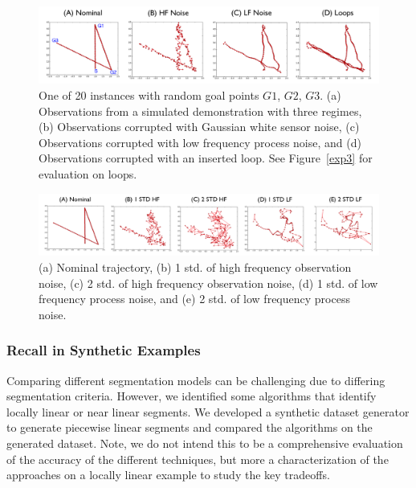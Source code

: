 \begin{figure}[ht!]%
\centering
\includegraphics[width=\textwidth]{tsc-experiments/tsc_segmentation_benchmark.png}
\caption{One of 20 instances with random goal points $G1$, $G2$, $G3$. (a) Observations from a simulated demonstration with three regimes, (b) Observations corrupted with Gaussian white sensor noise, (c) Observations corrupted with low frequency process noise, and (d) Observations corrupted with an inserted loop. See Figure~\ref{exp3} for evaluation on loops. \label{simulated}}
\end{figure}

\begin{figure}[ht!]%
\centering
\includegraphics[width=\textwidth]{tsc-experiments/noise_illustration.png}
\caption{(a) Nominal trajectory, (b) 1 std. of high frequency observation noise, (c) 2 std. of high frequency observation noise,  (d) 1 std. of low frequency process noise, and (e) 2 std. of low frequency process noise. \label{simulated-noise}}
\end{figure}

\subsubsection{Recall in Synthetic Examples}
Comparing different segmentation models can be challenging due to differing segmentation criteria. However, we identified some algorithms that identify locally linear or near linear segments.
We developed a synthetic dataset generator to generate piecewise linear segments and compared the algorithms on the generated dataset.
Note, we do not intend this to be a comprehensive evaluation of the accuracy of the different techniques, but more a characterization of the approaches on a locally linear example to study the key tradeoffs.

